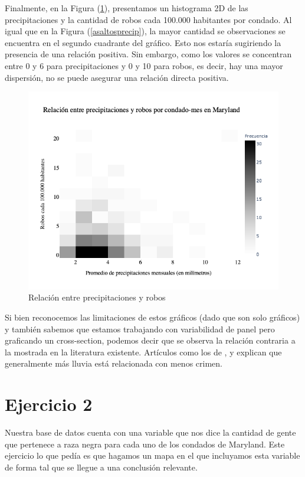 \documentclass[12pt]{article}
\begin{document}
Finalmente, en la Figura (\ref{roboprecip}), presentamos un histograma 2D de las precipitaciones y la cantidad de robos cada 100.000 habitantes por condado. Al igual que en la Figura (\ref{asaltosprecip}), la mayor cantidad se observaciones se encuentra en el segundo cuadrante del gr\'afico. Esto nos estar\'ia sugiriendo la presencia de una relaci\'on positiva. Sin embargo, como los valores se concentran entre 0 y 6 para precipitaciones y 0 y 10 para robos, es decir, hay una mayor dispersi\'on, no se puede asegurar una relaci\'on directa positiva. \begin{figure}[htbp]
    \centering
    \includegraphics[width = \textwidth]{graficos/Precip_Robo_H2De.png}
    \caption{Relaci\'on entre precipitaciones y robos}
    \label{roboprecip}
\end{figure}

Si bien reconocemos las limitaciones de estos gr\'aficos (dado que son solo gr\'aficos) y tambi\'en sabemos que estamos trabajando con variabilidad de panel pero graficando un cross-section, podemos decir que se observa la relaci\'on contraria a la mostrada en la literatura existente. Art\'iculos como los de \citet{cohn1990weather}, \citet{field1992effect} y \citet{jacob2007dynamics} explican que generalmente m\'as lluvia est\'a relacionada con menos crimen. 

\section*{Ejercicio 2}

Nuestra base de datos cuenta con una variable que nos dice la cantidad de gente que pertenece a raza negra para cada uno de los condados de Maryland. Este ejercicio lo que ped\'ia es que hagamos un mapa en el que incluyamos esta variable de forma tal que se llegue a una conclusi\'on relevante. 
\end{document}
